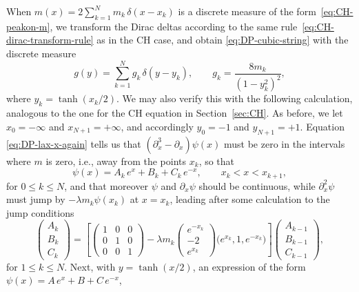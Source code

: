 \documentclass[10pt,a4paper]{article} \pdfoutput=1 
\begin{document}
When
$m(x) = 2 \sum_{k=1}^N m_k \, \delta(x-x_k)$
is a discrete measure of the form~\eqref{eq:CH-peakon-m},
we transform the Dirac deltas
according to the same rule~\eqref{eq:CH-dirac-transform-rule}
as in the CH case,
and obtain \eqref{eq:DP-cubic-string} with the discrete measure
\begin{equation}
  \label{eq:DP-peakon-g}
  g(y) = \sum_{k=1}^N g_k \, \delta(y-y_k)
  ,\qquad
  g_k = \frac{8 m_k}{(1-y_k^2)^2}
  ,
\end{equation}
where $y_k = \tanh(x_k/2)$.
We may also verify this with the following calculation, analogous to the one
for the CH equation in Section~\ref{sec:CH}.
As before, we let $x_0 = -\infty$ and $x_{N+1} = +\infty$,
and accordingly $y_0 = -1$ and $y_{N+1} = +1$.
Equation \eqref{eq:DP-lax-x-again} tells us that $(\partial_x^3 - \partial_x) \psi(x)$
must be zero in the intervals where $m$ is zero,
i.e., away from the points $x_k$, so that
\begin{equation}
  \label{eq:DP-psi-piecewise}
  \psi(x) = A_k \, e^x + B_k + C_k \, e^{-x}
  ,\qquad
  x_k < x < x_{k+1}
  ,
\end{equation}
for $0 \le k \le N$,
and that moreover $\psi$ and $\partial_x \psi$ should be continuous,
while $\partial_x^2 \psi$ must jump by $-\lambda m_k \psi(x_k)$ at $x=x_k$,
leading after some calculation to the jump conditions
\begin{equation}
  \label{eq:DP-jump-relation-psi}
  \begin{pmatrix} A_k \\ B_k \\ C_k \end{pmatrix}
  =
  \left[
    \begin{pmatrix} 1 & 0 & 0 \\ 0 & 1 & 0 \\ 0 & 0 & 1 \end{pmatrix}
    - \lambda m_k
    \begin{pmatrix} e^{-x_k} \\ -2  \\ e^{x_k} \end{pmatrix}
    \bigl( e^{x_k}, 1, e^{-x_k} \bigr)
  \right]
  \begin{pmatrix} A_{k-1}\\ B_{k-1}\\ C_{k-1} \end{pmatrix}
  ,
\end{equation}
for $1 \le k \le N$.
Next, with $y = \tanh(x/2)$, an expression of the form
$\psi(x) = A \, e^x + B + C \, e^{-x}$,
\end{document}
